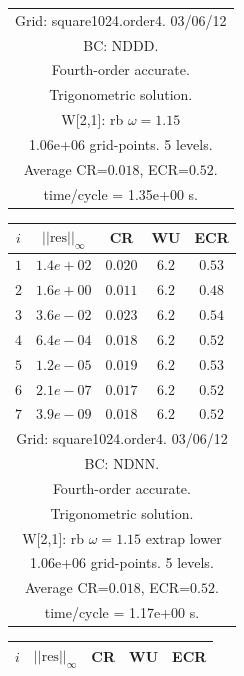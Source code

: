 \begin{table}[hbt]
\begin{center}
{\begin{tabular}{|c|c|c|c|c|}
\hline 
\multicolumn{5}{|c|}{Grid: square1024.order4. 03/06/12}  \\
\multicolumn{5}{|c|}{BC: NDDD.}  \\
\multicolumn{5}{|c|}{Fourth-order accurate.}  \\
\multicolumn{5}{|c|}{Trigonometric solution.}  \\
\multicolumn{5}{|c|}{W[2,1]: rb $\omega=1.15$}  \\
\multicolumn{5}{|c|}{1.06e+06 grid-points. 5 levels.}  \\
\multicolumn{5}{|c|}{Average CR=$0.018$, ECR=$0.52$.}  \\
\multicolumn{5}{|c|}{time/cycle = 1.35e+00 s.}  \\
\hline 
\end{tabular}
\begin{tabular}{|c|c|c|c|c|} \hline 
 $i$   & $\vert\vert\mbox{res}\vert\vert_\infty$  &  CR     &  WU    & ECR  \\   \hline 
 $ 1$  & $ 1.4e+02$ & $0.020$ & $ 6.2$ & $0.53$ \\ 
 $ 2$  & $ 1.6e+00$ & $0.011$ & $ 6.2$ & $0.48$ \\ 
 $ 3$  & $ 3.6e-02$ & $0.023$ & $ 6.2$ & $0.54$ \\ 
 $ 4$  & $ 6.4e-04$ & $0.018$ & $ 6.2$ & $0.52$ \\ 
 $ 5$  & $ 1.2e-05$ & $0.019$ & $ 6.2$ & $0.53$ \\ 
 $ 6$  & $ 2.1e-07$ & $0.017$ & $ 6.2$ & $0.52$ \\ 
 $ 7$  & $ 3.9e-09$ & $0.018$ & $ 6.2$ & $0.52$ \\ 
\hline 
\multicolumn{5}{|c|}{Grid: square1024.order4. 03/06/12}  \\
\multicolumn{5}{|c|}{BC: NDNN.}  \\
\multicolumn{5}{|c|}{Fourth-order accurate.}  \\
\multicolumn{5}{|c|}{Trigonometric solution.}  \\
\multicolumn{5}{|c|}{W[2,1]: rb $\omega=1.15$ extrap lower}  \\
\multicolumn{5}{|c|}{1.06e+06 grid-points. 5 levels.}  \\
\multicolumn{5}{|c|}{Average CR=$0.018$, ECR=$0.52$.}  \\
\multicolumn{5}{|c|}{time/cycle = 1.17e+00 s.}  \\
\hline 
\end{tabular}
\begin{tabular}{|c|c|c|c|c|} \hline 
 $i$   & $\vert\vert\mbox{res}\vert\vert_\infty$  &  CR     &  WU    & ECR  \\   \hline 

\end{tabular}}
\end{center}
\end{table}
